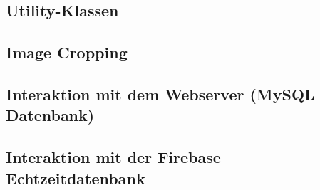 \documentclass[../main.tex]{subfiles}
\begin{document}
	
	
	\subsection{Utility-Klassen}
	
	
	\subsection{Image Cropping} \label{imageCropping}
	\subsection{Interaktion mit dem Webserver (MySQL Datenbank)}
	\subsection{Interaktion mit der Firebase Echtzeitdatenbank}
	
\end{document}
